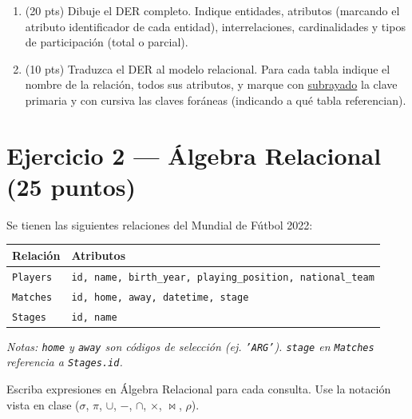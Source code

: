 \documentclass[11pt,a4paper]{article}
\begin{document}
\begin{enumerate}
  \item (20 pts) Dibuje el DER completo. Indique entidades, atributos (marcando el atributo identificador de cada entidad), interrelaciones, cardinalidades y tipos de participación (total o parcial).
  \vspace{10cm}
  \item (10 pts) Traduzca el DER al modelo relacional. Para cada tabla indique el nombre de la relación, todos sus atributos, y marque con \underline{subrayado} la clave primaria y con cursiva las claves foráneas (indicando a qué tabla referencian).
\end{enumerate}

\newpage

\section*{Ejercicio 2 — Álgebra Relacional \hfill\normalfont(25 puntos)}

Se tienen las siguientes relaciones del Mundial de Fútbol 2022:

\begin{center}
\begin{tabular}{ll}
\toprule
\textbf{Relación} & \textbf{Atributos} \\
\midrule
\texttt{Players} & \texttt{id, name, birth\_year, playing\_position, national\_team} \\
\texttt{Matches}  & \texttt{id, home, away, datetime, stage} \\
\texttt{Stages}   & \texttt{id, name} \\
\midrule
\end{tabular}
\end{center}

\noindent\small\textit{Notas: \texttt{home} y \texttt{away} son códigos de selección (ej. \texttt{'ARG'}). \texttt{stage} en \texttt{Matches} referencia a \texttt{Stages.id}.}

\normalsize
\vspace{4pt}
Escriba expresiones en Álgebra Relacional para cada consulta. Use la notación vista en clase ($\sigma$, $\pi$, $\cup$, $-$, $\cap$, $\times$, $\bowtie$, $\rho$).
\end{document}
